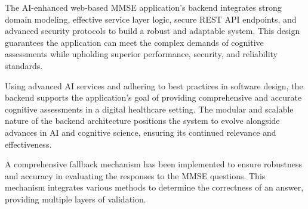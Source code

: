 The AI-enhanced web-based MMSE application's backend integrates strong domain modeling, effective service layer logic, secure REST API endpoints, and advanced security protocols to build a robust and adaptable system. This design guarantees the application can meet the complex demands of cognitive assessments while upholding superior performance, security, and reliability standards.

Using advanced AI services and adhering to best practices in software design, the backend supports the application's goal of providing comprehensive and accurate cognitive assessments in a digital healthcare setting. The modular and scalable nature of the backend architecture positions the system to evolve alongside advances in AI and cognitive science, ensuring its continued relevance and effectiveness.

A comprehensive fallback mechanism has been implemented to ensure robustness and accuracy in evaluating the responses to the MMSE questions. This mechanism integrates various methods to determine the correctness of an answer, providing multiple layers of validation.


